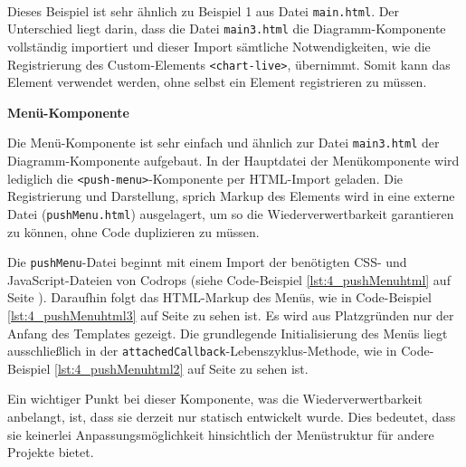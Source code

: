 \begin{enumerate}






 \hfill \\
Dieses Beispiel ist sehr ähnlich zu Beispiel 1 aus Datei \lstinline|main.html|. Der Unterschied liegt darin, dass die Datei \lstinline|main3.html| die Diagramm-Komponente vollständig importiert und dieser Import sämtliche Notwendigkeiten, wie die Registrierung des Custom-Elements \lstinline|<chart-live>|, übernimmt. Somit kann das Element verwendet werden, ohne selbst ein Element registrieren zu müssen.
\end{enumerate}

\textbf{Menü-Komponente}

Die Menü-Komponente ist sehr einfach und ähnlich zur Datei \lstinline|main3.html| der Diagramm-Komponente aufgebaut. In der Hauptdatei der Menükomponente wird lediglich die \lstinline|<push-menu>|-Komponente per HTML-Import geladen. Die Registrierung und Darstellung, sprich Markup des Elements wird in eine externe Datei (\lstinline|pushMenu.html|) ausgelagert, um so die Wiederverwertbarkeit garantieren zu können, ohne Code duplizieren zu müssen.

Die \lstinline|pushMenu|-Datei beginnt mit einem Import der benötigten CSS- und JavaScript-Dateien von Codrops (siehe Code-Beispiel \ref{lst:4_pushMenuhtml} auf Seite \pageref{lst:4_pushMenuhtml}). Daraufhin folgt das HTML-Markup des Menüs, wie in Code-Beispiel \ref{lst:4_pushMenuhtml3} auf Seite \pageref{lst:4_pushMenuhtml3} zu sehen ist. Es wird aus Platzgründen nur der Anfang des Templates gezeigt. Die grundlegende Initialisierung des Menüs liegt ausschließlich in der \lstinline|attachedCallback|-Lebenszyklus-Methode, wie in Code-Beispiel \ref{lst:4_pushMenuhtml2} auf Seite \pageref{lst:4_pushMenuhtml2} zu sehen ist.

Ein wichtiger Punkt bei dieser Komponente, was die Wiederverwertbarkeit anbelangt, ist, dass sie derzeit nur statisch entwickelt wurde. Dies bedeutet, dass sie keinerlei Anpassungsmöglichkeit hinsichtlich der Menüstruktur für andere Projekte bietet.

